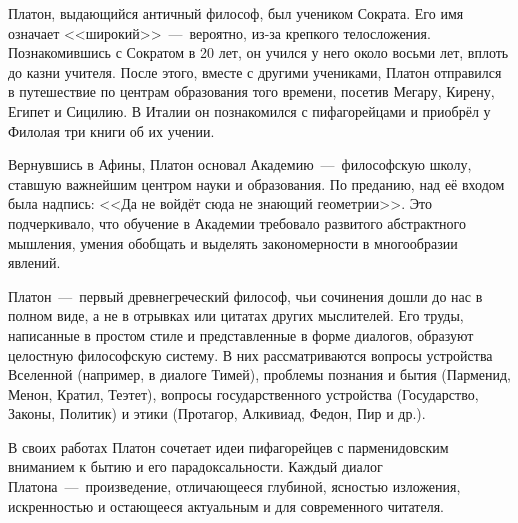 Платон, выдающийся античный философ, был учеником Сократа. Его имя означает <<широкий>>~---~вероятно, из-за крепкого телосложения. Познакомившись с Сократом в 20 лет, он учился у него около восьми лет, вплоть до казни учителя. После этого, вместе с другими учениками, Платон отправился в путешествие по центрам образования того времени, посетив Мегару, Кирену, Египет и Сицилию. В Италии он познакомился с пифагорейцами и приобрёл у Филолая три книги об их учении.

Вернувшись в Афины, Платон основал Академию~---~философскую школу, ставшую важнейшим центром науки и образования. По преданию, над её входом была надпись: <<Да не войдёт сюда не знающий геометрии>>. Это подчеркивало, что обучение в Академии требовало развитого абстрактного мышления, умения обобщать и выделять закономерности в многообразии явлений.


Платон~---~первый древнегреческий философ, чьи сочинения дошли до нас в полном виде, а не в отрывках или цитатах других мыслителей. Его труды, написанные в простом стиле и представленные в форме диалогов, образуют целостную философскую систему. В них рассматриваются вопросы устройства Вселенной (например, в диалоге Тимей), проблемы познания и бытия (Парменид, Менон, Кратил, Теэтет), вопросы государственного устройства (Государство, Законы, Политик) и этики (Протагор, Алкивиад, Федон, Пир и др.).

В своих работах Платон сочетает идеи пифагорейцев с парменидовским вниманием к бытию и его парадоксальности. Каждый диалог Платона~---~произведение, отличающееся глубиной, ясностью изложения, искренностью и остающееся актуальным и для современного читателя.

